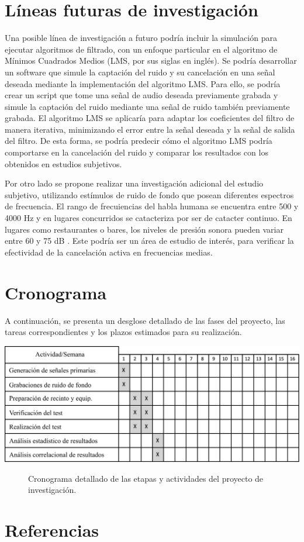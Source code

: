 \documentclass[a4paper,12pt]{article}
\begin{document}
\section{Líneas futuras de investigación}

Una posible línea de investigación a futuro podría incluir la simulación para ejecutar algoritmos de filtrado, con un enfoque particular en el algoritmo de Mínimos Cuadrados Medios (LMS, por sus siglas en inglés).
Se podría desarrollar un software que simule la captación del ruido y su cancelación en una señal deseada mediante la implementación del algoritmo LMS.
Para ello, se podría crear un script que tome una señal de audio deseada previamente grabada y simule la captación del ruido mediante una señal de ruido también previamente grabada.
El algoritmo LMS se aplicaría para adaptar los coeficientes del filtro de manera iterativa, minimizando el error entre la señal deseada y la señal de salida del filtro.
De esta forma, se podría predecir cómo el algoritmo LMS podría comportarse en la cancelación del ruido y comparar los resultados con los obtenidos en estudios subjetivos.

Por otro lado se propone realizar una investigación adicional del estudio subjetivo, utilizando estímulos de ruido de fondo que posean diferentes espectros de frecuencia.
El rango de frecuiencias del habla humana se encuentra entre 500 y 4000 $\si{\hertz}$ y en lugares concurridos se catacteriza por ser de catacter continuo.
En lugares como restaurantes o bares, los niveles de presión sonora pueden variar entre 60 y 75 \si{\deci \bel} \parencite{Scott2024}.
Este podría ser un área de estudio de interés, para verificar la efectividad de la cancelación activa en frecuencias medias.

\section{Cronograma}

A continuación, se presenta un desglose detallado de las fases del proyecto, las tareas correspondientes y los plazos estimados para su realización.

\begin{center}
    \includegraphics[width=\linewidth]{images/schedule.png}
\end{center}
\vspace{\captionSpace}
\begin{figure}[H]
    \caption{Cronograma detallado de las etapas y actividades del proyecto de investigación.}
    \label{fig:schedule}
\end{figure}

\section{Referencias}
\renewcommand{\refname}{}
\vspace{-3em}
\printbibliography
\end{document}

